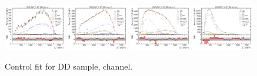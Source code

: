 \begin{figure}[htb]
    \includegraphics[width=0.24\textwidth]{./figs-fit-fit-results/ctrl-fit/lines_q2_slices/fit_result-lines_q2_idx1-D0-dd-el.pdf}
    \includegraphics[width=0.24\textwidth]{./figs-fit-fit-results/ctrl-fit/lines_q2_slices/fit_result-lines_q2_idx2-D0-dd-el.pdf}
    \includegraphics[width=0.24\textwidth]{./figs-fit-fit-results/ctrl-fit/lines_q2_slices/fit_result-lines_q2_idx3-D0-dd-el.pdf}
    \includegraphics[width=0.24\textwidth]{./figs-fit-fit-results/ctrl-fit/lines_q2_slices/fit_result-lines_q2_idx4-D0-dd-el.pdf}

    \caption{Control fit for DD sample, \Dz channel.}
    \label{fig:ctrl-dd-d0}
\end{figure}

